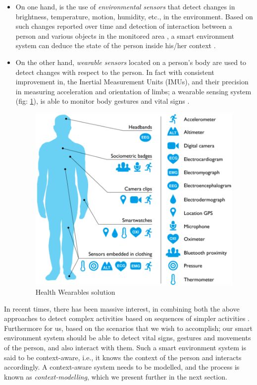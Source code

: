 \documentclass{thesisreport}
\begin{document}
 \begin{itemize}
    \item On one hand, is the use of \emph{environmental sensors} that detect changes in brightness, temperature, motion, humidity, etc., in the environment. Based on such changes reported over time and detection of interaction between a person and various objects in the monitored area \cite{scalmato2012describing}, a smart environment system can deduce the state of the person inside his/her context \cite{aggarwal2011human}.
    
    \item On the other hand, \emph{wearable sensors} located on a person's body are used to detect changes with respect to the person. In fact with consistent improvement in, the Inertial Measurement Units (IMUs), and their precision in measuring acceleration and orientation of limbs; a wearable sensing system (fig: \ref{fig:Wearables}), is able to monitor body gestures and vital signs \cite{bruno2013analysis}.
 
    \begin{figure}
		\centering
		\includegraphics[width=10.5cm]{Thesis/data/sensoring.png}
		\caption{Health Wearables solution \cite{Wearables2016rise}}
		\label{fig:Wearables}
	\end{figure}
	
\end{itemize}

In recent times, there has been massive interest, in combining both the above approaches to detect complex activities based on sequences of simpler activities \cite{bruno2014public, noor2018ontology}. Furthermore for us, based on the scenarios that we wish to accomplish; our smart environment system should be able to detect vital signs, gestures and movements of the person, and also interact with them. Such a smart environment system is said to be context-aware, i.e., it knows the context of the person and interacts accordingly. A context-aware system needs to be modelled, and the process is known as \emph{context-modelling}, which we present further in the next section.
\end{document}
